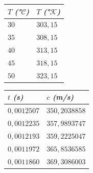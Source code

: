 \documentclass[twocolumn, 12pt]{article}
\newcommand{\bolditalic}[1]{\textbf{\textit{#1}}}
\begin{document}
\begin{table}[H]
    \begin{center}
        \begin{tabularx}{.9\linewidth}{|>{\centering\arraybackslash}X|>{\centering\arraybackslash}X|}
            \hline
            $T$ \bolditalic{(°$\mathcal{C}$)} & $T$ \bolditalic{(°$\mathcal{K}$)} \\\hline
            $30$                              & $303,15$                          \\\hline
            $35$                              & $308,15$                          \\\hline
            $40$                              & $313,15$                          \\\hline
            $45$                              & $318,15$                          \\\hline
            $50$                              & $323,15$                          \\\hline
        \end{tabularx}
    \end{center}
\end{table}

\begin{table}[H]
    \begin{center}
        \begin{tabularx}{.9\linewidth}{|>{\centering\arraybackslash}X|>{\centering\arraybackslash}X|}
            \hline
            $t$ \bolditalic{(s)} & $c$ \bolditalic{(m/s)} \\\hline
            $0,0012507$          & $350,2038858$          \\\hline
            $0,0012235$          & $357,9893747$          \\\hline
            $0,0012193$          & $359,2225047$          \\\hline
            $0,0011972$          & $365,8536585$          \\\hline
            $0,0011860$          & $369,3086003$          \\\hline
        \end{tabularx}
    \end{center}
\end{table}
\end{document}
